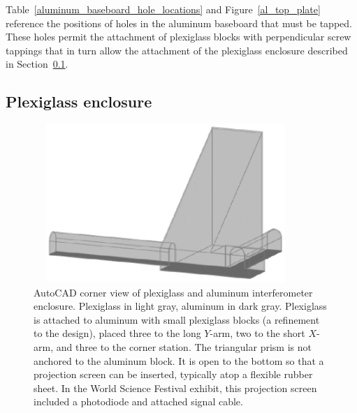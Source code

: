 Table~\ref{aluminum_baseboard_hole_locations} and Figure~\ref{al_top_plate} reference the positions of holes in the aluminum baseboard that must be tapped. These holes permit the attachment of plexiglass blocks with perpendicular screw tappings that in turn allow the attachment of the plexiglass enclosure described in Section~\ref{enclosure}.

        \subsection{Plexiglass enclosure}
        \label{enclosure}


        \begin{figure}
        \begin{center}
        \includegraphics[height=60mm, width=100mm]{view-corner.eps}
        \caption{AutoCAD corner view of plexiglass and aluminum interferometer enclosure. Plexiglass in light gray, aluminum in dark gray. Plexiglass is attached to aluminum with small plexiglass blocks (a refinement to the design), placed three to the long $Y$-arm, two to the short $X$-arm, and three to the corner station. The triangular prism is not anchored to the aluminum block. It is open to the bottom so that a projection screen can be inserted, typically atop a flexible rubber sheet. In the World Science Festival exhibit, this projection screen included a photodiode and attached signal cable.}
        \label{plex-view-corner}
        \end{center}
        \end{figure}

